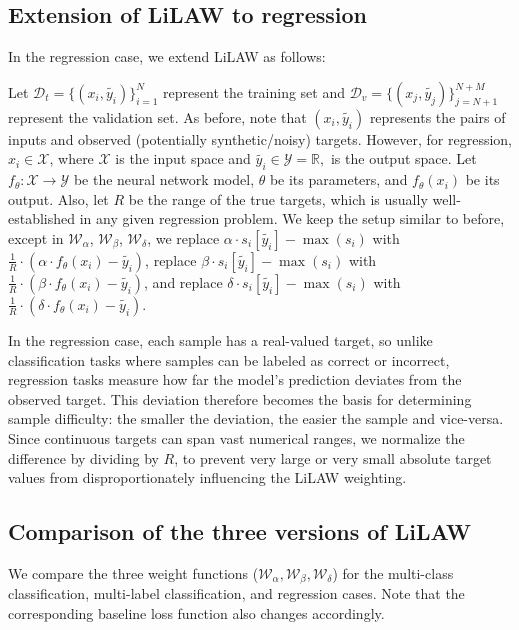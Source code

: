 \documentclass{article}
\theoremstyle{plain}
\theoremstyle{definition}
\theoremstyle{remark}
\begin{document}
\subsection{Extension of LiLAW to regression}
\label{sec:regression}
In the regression case, we extend LiLAW as follows:

Let $\mathcal{D}_{t} = \{(x_i, \widetilde{y_i})\}^N_{i=1}$ represent the training set and $\mathcal{D}_{v} = \{(x_j, \widetilde{y_j})\}^{N+M}_{j=N+1}$ represent the validation set. As before, note that $(x_i, \widetilde{y_i})$ represents the pairs of inputs and observed (potentially synthetic/noisy) targets. However, for regression, $x_i \in \mathcal{X}$, where $\mathcal{X}$ is the input space and $\widetilde{y_i} \in \mathcal{Y} = \mathbb{R},$ is the output space. Let $f_{\theta}: \mathcal{X} \rightarrow \mathcal{Y}$ be the neural network model, $\theta$ be its parameters, and $f_{\theta}(x_i)$ be its output. Also, let $R$ be the range of the true targets, which is usually well-established in any given regression problem. We keep the setup similar to before, except in $\mathcal{W}_\alpha$, $\mathcal{W}_\beta$, $\mathcal{W}_\delta$, we replace $\alpha \cdot s_i[\widetilde{y_i}] - \max(s_i)$ with $\frac{1}{R}\cdot (\alpha \cdot f_{\theta}(x_i) - \widetilde{y_i})$, replace $\beta \cdot s_i[\widetilde{y_i}] - \max(s_i)$ with $\frac{1}{R}\cdot (\beta \cdot f_{\theta}(x_i) - \widetilde{y_i})$, and replace $\delta \cdot s_i[\widetilde{y_i}] - \max(s_i)$ with $\frac{1}{R}\cdot (\delta \cdot f_{\theta}(x_i) - \widetilde{y_i})$.

In the regression case, each sample has a real-valued target, so unlike classification tasks where samples can be labeled as correct or incorrect, regression tasks measure how far the model's prediction deviates from the observed target. This deviation therefore becomes the basis for determining sample difficulty: the smaller the deviation, the easier the sample and vice-versa. Since continuous targets can span vast numerical ranges, we normalize the difference by dividing by $R$, to prevent very large or very small absolute target values from disproportionately influencing the LiLAW weighting.

\subsection{Comparison of the three versions of LiLAW}
\label{comparison}
We compare the three weight functions ($\mathcal{W}_\alpha,\mathcal{W}_\beta,\mathcal{W}_\delta$) for the multi-class classification, multi-label classification, and regression cases. Note that the corresponding baseline loss function also changes accordingly.
\end{document}
